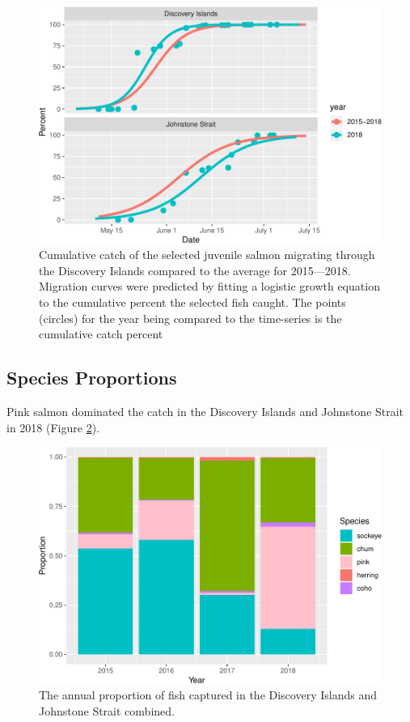 \documentclass[fleqn,10pt]{wlpeerj} %
\begin{document}
\begin{figure}
\includegraphics[width=0.8\linewidth]{peer_j_migration_dynamics_files/figure-latex/mt-1} \caption{Cumulative catch of the selected juvenile salmon migrating through the Discovery Islands compared to the average for 2015—2018. Migration curves were predicted by fitting a logistic growth equation to the cumulative percent the selected fish caught. The points (circles) for the year being compared to the time-series is the cumulative catch percent}\label{fig:mt}
\end{figure}

\subsection*{Species Proportions}\label{species-proportions}

Pink salmon dominated the catch in the Discovery Islands and Johnstone
Strait in 2018 (Figure \ref{fig:prop}).

\begin{figure}
\includegraphics[width=0.8\linewidth]{peer_j_migration_dynamics_files/figure-latex/prop-1} \caption{The annual proportion of fish captured in the Discovery Islands and Johnstone Strait combined.}\label{fig:prop}
\end{figure}
\end{document}
